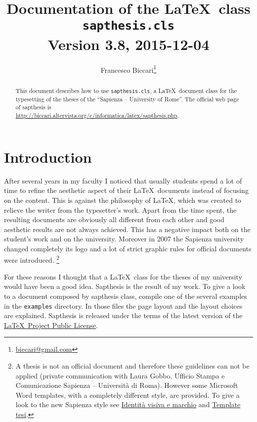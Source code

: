 \documentclass[a5paper,11pt]{article}
\author{\small Francesco Biccari\thanks{\href{mailto:biccari@gmail.com}{biccari@gmail.com}}}
\title{\small Documentation of the \LaTeX\ class\\
		\Large \textbf{\texttt{sapthesis.cls}}\\
		\small \vspace{0.2cm} Version 3.8, 2015-12-04
}
\date{}
\begin{document}
\maketitle

\begin{abstract}\noindent
This document describes how to use \texttt{sapthesis.cls}, a \LaTeX\ document class for the typesetting of the theses of the ``Sapienza -- University of Rome''. The official web page of \textsf{sapthesis} is\\
{\footnotesize\url{http://biccari.altervista.org/c/informatica/latex/sapthesis.php}}.
\end{abstract}

\setcounter{tocdepth}{2}
\renewcommand{\columnseprule}{0.4pt}
\setlength{\columnsep}{1.5cm}

{\small
\tableofcontents}

\clearpage

\section{Introduction}

After several years in my faculty I noticed that usually students spend a lot of time to refine the aesthetic aspect of their \LaTeX\ documents instead of focusing on the content.
This is against the philosophy of \LaTeX, which was created to relieve the writer from the typesetter's work.
Apart from the time spent, the resulting documents are obviously all different from each other and good aesthetic results are not always achieved.
This has a negative impact both on the student's work and on the university.
Moreover in 2007 the Sapienza university changed completely its
logo and a lot of strict graphic rules for official documents were introduced.%
\footnote{A thesis is not an official document and therefore these guidelines can not be applied (private communication with Laura Gobbo, Ufficio Stampa e Comunicazione Sapienza -- Universit\`a di Roma).
However some Microsoft Word templates, with a completely different style, are provided.
To give a look to the new Sapienza style see 
\href{http://www.uniroma1.it/ateneo/chi-siamo/identit\%C3\%A0-visiva-e-marchio}{Identit\`a visiva e marchio} and \href{http://www.uniroma1.it/logotesi}{Template tesi}.}

For these reasons I thought that a \LaTeX\ class for the theses of my 
university would have been a good idea.
\textsf{Sapthesis} is the result of my work.
To give a look to a document composed by \textsf{sapthesis} class, compile one of the several examples in the \texttt{examples} directory.
In those files the page layout and the layout choices are explained.
\textsf{Sapthesis} is released under the terms of the latest version of the 
\href{http://www.latex-project.org/lppl/}{\LaTeX\ Project Public License}.
\end{document}
